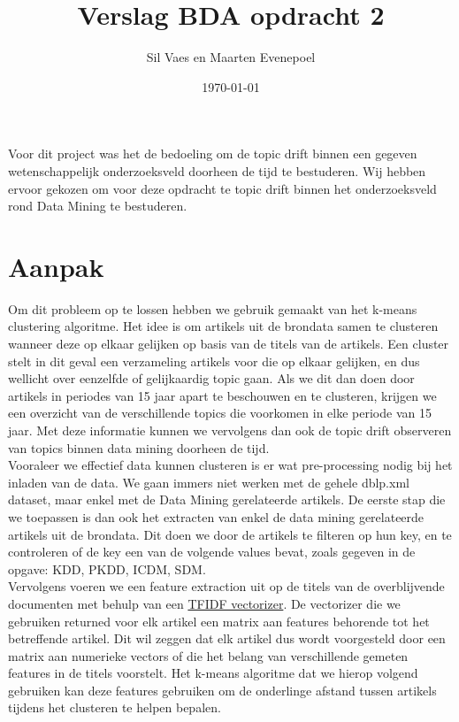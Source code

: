\documentclass[11pt]{article}
\author{Sil Vaes en Maarten Evenepoel}
\date{\today}
\title{Verslag BDA opdracht 2}
\begin{document}
\maketitle
\setlength\parindent{0pt}

Voor dit project was het de bedoeling om de topic drift binnen een gegeven wetenschappelijk onderzoeksveld doorheen de tijd te bestuderen. Wij hebben ervoor gekozen om voor deze opdracht te topic drift binnen het onderzoeksveld rond Data Mining te bestuderen. 

\section{Aanpak}

Om dit probleem op te lossen hebben we gebruik gemaakt van het k-means clustering algoritme. Het idee is om artikels uit de brondata samen te clusteren wanneer deze op elkaar gelijken op basis van de titels van de artikels. Een cluster stelt in dit geval een verzameling artikels voor die op elkaar gelijken, en dus wellicht over eenzelfde of gelijkaardig topic gaan. Als we dit dan doen door artikels in periodes van 15 jaar apart te beschouwen en te clusteren, krijgen we een overzicht van de verschillende topics die voorkomen in elke periode van 15 jaar. Met deze informatie kunnen we vervolgens dan ook de topic drift observeren van topics binnen data mining doorheen de tijd. \\

Vooraleer we effectief data kunnen clusteren is er wat pre-processing nodig bij het inladen van de data. We gaan immers niet werken met de gehele dblp.xml dataset, maar enkel met de Data Mining gerelateerde artikels. De eerste stap die we toepassen is dan ook het extracten van enkel de data mining gerelateerde artikels uit de brondata. Dit doen we door de artikels te filteren op hun key, en te controleren of de key een van de volgende values bevat, zoals gegeven in de opgave: KDD, PKDD, ICDM, SDM. \\

Vervolgens voeren we een feature extraction uit op de titels van de overblijvende documenten met behulp van een \hyperlink{https://scikit-learn.org/stable/modules/generated/sklearn.feature_extraction.text.TfidfVectorizer.html}{TFIDF vectorizer}. De vectorizer die we gebruiken returned voor elk artikel een matrix aan features behorende tot het betreffende artikel. Dit wil zeggen dat elk artikel dus wordt voorgesteld door een matrix aan numerieke vectors of die het belang van verschillende gemeten features in de titels voorstelt. Het k-means algoritme dat we hierop volgend gebruiken kan deze features gebruiken om de onderlinge afstand tussen artikels tijdens het clusteren te helpen bepalen. \\
\end{document}
